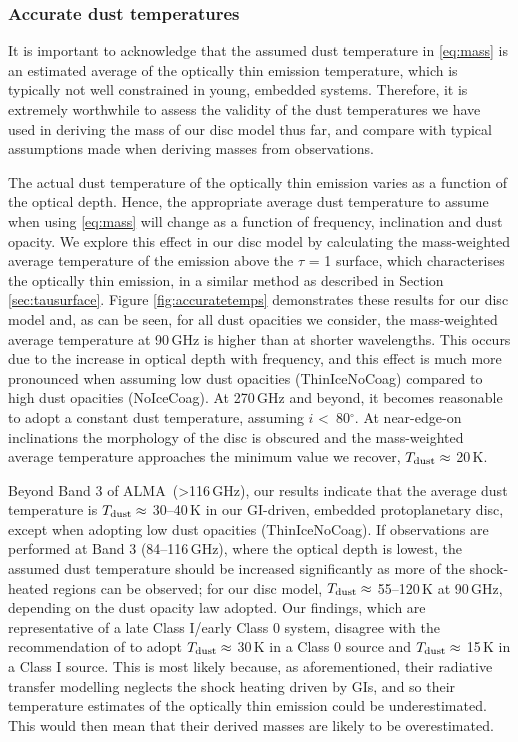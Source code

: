 \documentclass[fleqn,usenatbib]{mnras}
\newcommand{\alma}{ALMA}
\begin{document}
\subsubsection{Accurate dust temperatures}
\label{sec:accuratetemps}

It is important to acknowledge that the assumed dust temperature in \autoref{eq:mass} is an estimated average of the optically thin emission temperature, which is typically not well constrained in young, embedded systems. Therefore, it is extremely worthwhile to assess the validity of the dust temperatures we have used in deriving the mass of our disc model thus far, and compare with typical assumptions made when deriving masses from observations.

\smallskip

The actual dust temperature of the optically thin emission varies as a function of the optical depth. Hence, the appropriate average dust temperature to assume when using \autoref{eq:mass} will change as a function of frequency, inclination and dust opacity. We explore this effect in our disc model by calculating the mass-weighted average temperature of the emission above the $\tau$ = 1 surface, which characterises the optically thin emission, in a similar method as described in Section \ref{sec:tausurface}. Figure \ref{fig:accuratetemps} demonstrates these results for our disc model and, as can be seen, for all dust opacities we consider, the mass-weighted average temperature at 90\,GHz is higher than at shorter wavelengths. This occurs due to the increase in optical depth with frequency, and this effect is much more pronounced when assuming low dust opacities (ThinIceNoCoag) compared to high dust opacities (NoIceCoag). At 270\,GHz and beyond, it becomes reasonable to adopt a constant dust temperature, assuming $i$ \textless\ 80$^\circ$. At near-edge-on inclinations the morphology of the disc is obscured and the mass-weighted average temperature approaches the minimum value we recover, $T_ {\rm dust} \approx$ 20\,K. 

\smallskip

Beyond Band 3 of \alma\ (\textgreater 116\,GHz), our results indicate that the average dust temperature is $T_ {\rm dust} \approx$ 30--40\,K in our GI-driven, embedded protoplanetary disc, except when adopting low dust opacities (ThinIceNoCoag). If observations are performed at Band 3 (84--116\,GHz), where the optical depth is lowest, the assumed dust temperature should be increased significantly as more of the shock-heated regions can be observed; for our disc model, $T_ {\rm dust} \approx$ 55--120\,K at 90\,GHz, depending on the dust opacity law adopted. Our findings, which are representative of a late Class I/early Class 0 system, disagree with the recommendation of \citet{Dunham&Vorobyov2014} to adopt $T_ {\rm dust} \approx$ 30\,K in a Class 0 source and $T_ {\rm dust} \approx$ 15\,K in a Class I source. This is most likely because, as aforementioned, their radiative transfer modelling neglects the shock heating driven by GIs, and so their temperature estimates of the optically thin emission could be underestimated. This would then mean that their derived masses are likely to be overestimated. 
\end{document}
